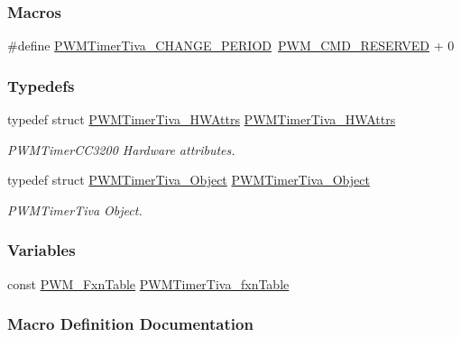 \subsubsection*{Macros}
\begin{DoxyCompactItemize}
\item 
\#define \hyperlink{_p_w_m_timer_tiva_8h_ad16a2de6625d6aabef487d2ec63e447c}{P\+W\+M\+Timer\+Tiva\+\_\+\+C\+H\+A\+N\+G\+E\+\_\+\+P\+E\+R\+I\+O\+D}~\hyperlink{_p_w_m_8h_ad731f4db58c72d280900da4be6e3434c}{P\+W\+M\+\_\+\+C\+M\+D\+\_\+\+R\+E\+S\+E\+R\+V\+E\+D} + 0
\end{DoxyCompactItemize}
\subsubsection*{Typedefs}
\begin{DoxyCompactItemize}
\item 
typedef struct \hyperlink{struct_p_w_m_timer_tiva___h_w_attrs}{P\+W\+M\+Timer\+Tiva\+\_\+\+H\+W\+Attrs} \hyperlink{_p_w_m_timer_tiva_8h_adfca3d3443cb74ff428f0e95e5cceefb}{P\+W\+M\+Timer\+Tiva\+\_\+\+H\+W\+Attrs}
\begin{DoxyCompactList}\small\item\em P\+W\+M\+Timer\+C\+C3200 Hardware attributes. \end{DoxyCompactList}\item 
typedef struct \hyperlink{struct_p_w_m_timer_tiva___object}{P\+W\+M\+Timer\+Tiva\+\_\+\+Object} \hyperlink{_p_w_m_timer_tiva_8h_aa113ed38a67720c1fbd892428c1a9952}{P\+W\+M\+Timer\+Tiva\+\_\+\+Object}
\begin{DoxyCompactList}\small\item\em P\+W\+M\+Timer\+Tiva Object. \end{DoxyCompactList}\end{DoxyCompactItemize}
\subsubsection*{Variables}
\begin{DoxyCompactItemize}
\item 
const \hyperlink{struct_p_w_m___fxn_table}{P\+W\+M\+\_\+\+Fxn\+Table} \hyperlink{_p_w_m_timer_tiva_8h_a9635643df3533a0642e7caa819c01a40}{P\+W\+M\+Timer\+Tiva\+\_\+fxn\+Table}
\end{DoxyCompactItemize}


\subsubsection{Macro Definition Documentation}
